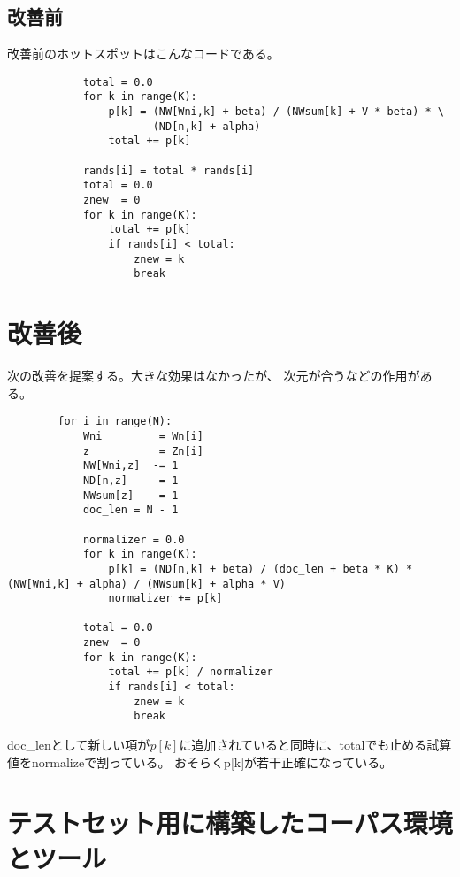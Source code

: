 \documentclass[uplatex]{jsarticle}
\begin{document}
\subsection{改善前}
改善前のホットスポットはこんなコードである。
\begin{lstlisting}
            total = 0.0
            for k in range(K):
                p[k] = (NW[Wni,k] + beta) / (NWsum[k] + V * beta) * \
                       (ND[n,k] + alpha)
                total += p[k]
            
            rands[i] = total * rands[i]
            total = 0.0
            znew  = 0
            for k in range(K):
                total += p[k]
                if rands[i] < total:
                    znew = k
                    break

\end{lstlisting}

\section{改善後}

次の改善を提案する。大きな効果はなかったが、
次元が合うなどの作用がある。

\begin{lstlisting}
        for i in range(N):
            Wni         = Wn[i]
            z           = Zn[i]
            NW[Wni,z]  -= 1
            ND[n,z]    -= 1
            NWsum[z]   -= 1
            doc_len = N - 1

            normalizer = 0.0
            for k in range(K):
                p[k] = (ND[n,k] + beta) / (doc_len + beta * K) * (NW[Wni,k] + alpha) / (NWsum[k] + alpha * V)
                normalizer += p[k]

            total = 0.0
            znew  = 0
            for k in range(K):
                total += p[k] / normalizer
                if rands[i] < total:
                    znew = k
                    break
\end{lstlisting}
doc\_lenとして新しい項が$p[k]$に追加されていると同時に、totalでも止める試算値をnormalizeで割っている。
おそらくp[k]が若干正確になっている。

\section{テストセット用に構築したコーパス環境とツール}
\end{document}
